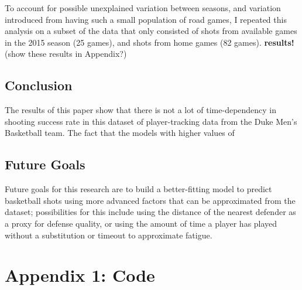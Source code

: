 \documentclass[12pt,twoside]{dukestatscithesis}
\theoremstyle{definition}
\theoremstyle{definition}
\theoremstyle{definition}
\theoremstyle{remark}
\begin{document}
To account for possible unexplained variation between seasons, and
variation introduced from having such a small population of road games,
I repeated this analysis on a subset of the data that only consisted of
shots from available games in the 2015 season (25 games), and shots from
home games (82 games). \textbf{results!} (show these results in
Appendix?)

\section{Conclusion}\label{conclusion}

The results of this paper show that there is not a lot of
time-dependency in shooting success rate in this dataset of
player-tracking data from the Duke Men's Basketball team. The fact that
the models with higher values of

\section{Future Goals}\label{future-goals}

Future goals for this research are to build a better-fitting model to
predict basketball shots using more advanced factors that can be
approximated from the dataset; possibilities for this include using the
distance of the nearest defender as a proxy for defense quality, or
using the amount of time a player has played without a substitution or
timeout to approximate fatigue.

\appendix

\chapter{Appendix 1: Code}\label{appendix-1-code}
\end{document}
